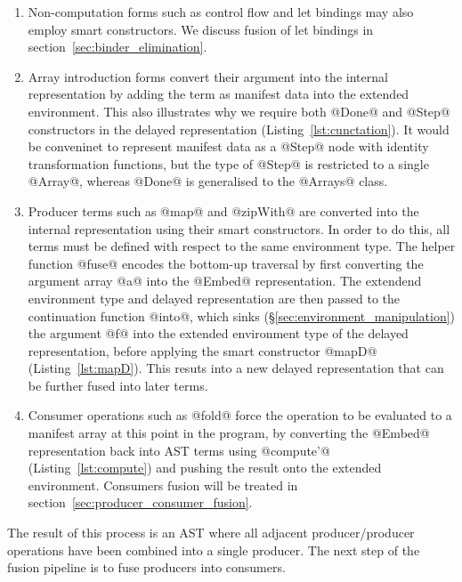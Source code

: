 \begin{enumerate}
\item Non-computation forms such as control flow and let bindings may also
    employ smart constructors. We discuss fusion of let bindings in
    section~\ref{sec:binder_elimination}.

\item Array introduction forms convert their argument into the internal
    representation by adding the term as manifest data into the extended
    environment. This also illustrates why we require both @Done@ and @Step@
    constructors in the delayed representation (Listing~\ref{lst:cunctation}).
    It would be conveninet to represent manifest data as a @Step@ node with
    identity transformation functions, but the type of @Step@ is restricted to a
    single @Array@, whereas @Done@ is generalised to the @Arrays@ class.

\item Producer terms such as @map@ and @zipWith@ are converted into the internal
    representation using their smart constructors. In order to do this, all
    terms must be defined with respect to the same environment type. The helper
    function @fuse@ encodes the bottom-up traversal by first converting the
    argument array @a@ into the @Embed@ representation. The extendend
    environment type and delayed representation are then passed to the
    continuation function @into@, which sinks
    (\S\ref{sec:environment_manipulation}) the argument @f@ into the extended
    environment type of the delayed representation, before applying the smart
    constructor @mapD@ (Listing~\ref{lst:mapD}). This resuts into a new delayed
    representation that can be further fused into later terms.

\item Consumer operations such as @fold@ force the operation to be evaluated to
    a manifest array at this point in the program, by converting the @Embed@
    representation back into AST terms using @compute'@
    (Listing~\ref{lst:compute}) and pushing the result onto the extended
    environment. Consumers fusion will be treated in
    section~\ref{sec:producer_consumer_fusion}.

\end{enumerate}

The result of this process is an AST where all adjacent producer/producer
operations have been combined into a single producer. The next step of the
fusion pipeline is to fuse producers into consumers.


